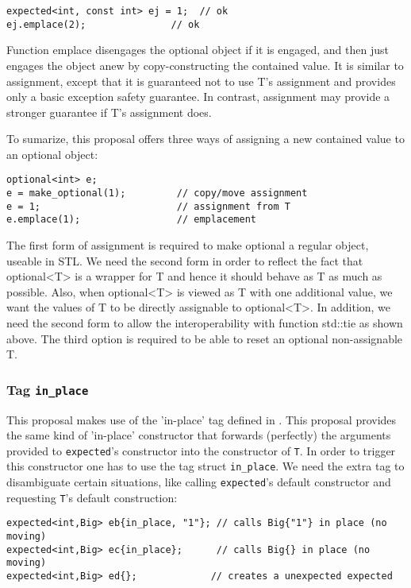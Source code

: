 \documentclass[a4paper,10pt]{article}
\newcommand{\cpp}[1]{\lstinline{#1}}
\begin{document}
\begin{lstlisting}
expected<int, const int> ej = 1;  // ok
ej.emplace(2);               // ok 
\end{lstlisting}

Function emplace disengages the optional object if it is engaged, and then just engages the object anew by copy-constructing the contained value. It is similar to assignment, except that it is guaranteed not to use T's assignment and provides only a basic exception safety guarantee. In contrast, assignment may provide a stronger guarantee if T's assignment does.

To sumarize, this proposal offers three ways of assigning a new contained value to an optional object:

\begin{lstlisting}
optional<int> e;
e = make_optional(1);         // copy/move assignment
e = 1;                        // assignment from T
e.emplace(1);                 // emplacement 
\end{lstlisting}

The first form of assignment is required to make optional a regular object, useable in STL. We need the second form in order to reflect the fact that optional<T> is a wrapper for T and hence it should behave as T as much as possible. Also, when optional<T> is viewed as T with one additional value, we want the values of T to be directly assignable to optional<T>. In addition, we need the second form to allow the interoperability with function std::tie as shown above. The third option is required to be able to reset an optional non-assignable T.

\subsubsection{Tag \cpp{in_place}}

This proposal makes use of the 'in-place' tag defined in \cite{OptionalRev5}. This proposal  provides the same kind of 'in-place' constructor that forwards (perfectly) the arguments provided to \cpp{expected}'s constructor into the constructor of \cpp{T}. In order to trigger this constructor one has to use the tag struct \cpp{in_place}. We need the extra tag to disambiguate certain situations, like calling \cpp{expected}'s default constructor and requesting \cpp{T}'s default construction:

\begin{lstlisting}
expected<int,Big> eb{in_place, "1"}; // calls Big{"1"} in place (no moving)
expected<int,Big> ec{in_place};      // calls Big{} in place (no moving)
expected<int,Big> ed{};             // creates a unexpected expected
\end{lstlisting}
\end{document}
